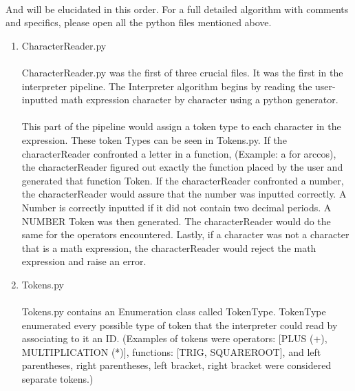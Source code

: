         \paragraph{}
        And will be elucidated in this order. For a full detailed algorithm with comments and specifics, please open all the python files mentioned above.

        \begin{enumerate}
            \item CharacterReader.py
            \paragraph{}
            CharacterReader.py was the first of three crucial files. It was the first in the interpreter pipeline. The Interpreter algorithm begins by reading the user-inputted math expression character by character using a python generator.

            \paragraph{}
            This part of the pipeline would assign a token type to each character in the expression. These token Types can be seen in Tokens.py. If the characterReader confronted a letter in a function, (Example: a for arccos), the characterReader figured out exactly the function placed by the user and generated that function Token. If the characterReader confronted a number, the characterReader would assure that the number was inputted correctly. A Number is correctly inputted if it did not contain two decimal periods. A NUMBER Token was then generated. The characterReader would do the same for the operators encountered. Lastly, if a character was not a character that is a math expression, the characterReader would reject the math expression and raise an error.

            \item Tokens.py
            \paragraph{}
            Tokens.py contains an Enumeration class called TokenType. TokenType enumerated every possible type of token that the interpreter could read by associating to it an ID. (Examples of tokens were operators: [PLUS (+), MULTIPLICATION (*)], functions: [TRIG, SQUAREROOT], and left parentheses, right parentheses, left bracket, right bracket were considered separate tokens.)


\end{enumerate}
